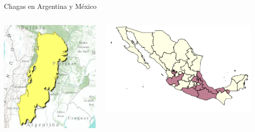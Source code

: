 \documentclass[xcolor=x11names]{beamer}
\begin{document}
\begin{frame}{Chagas en Argentina y México}
	\begin{columns}

		\begin{column}{0.45\textwidth}
			\centering
				\includegraphics[height=.7\textheight]{slides/GranChaco_TNC-Argentina.jpeg}
		\end{column}


		\begin{column}{0.45\textwidth}
			\centering
			\includegraphics[width=\textwidth]{slides/Ambientes_Gran_Chaco-Mexico_original.png}
		\end{column}


	\end{columns}
\end{frame}
\end{document}
